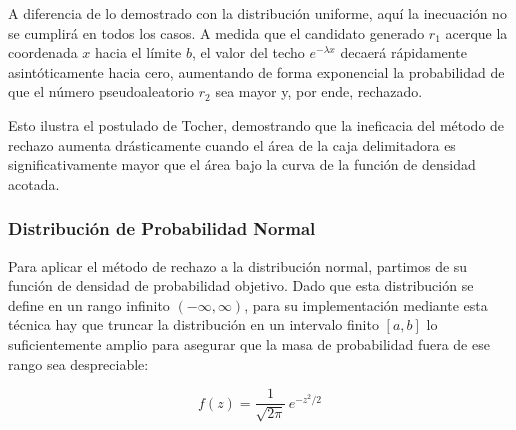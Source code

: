 \documentclass{article}
\begin{document}
A diferencia de lo demostrado con la distribución uniforme, aquí la inecuación no se
cumplirá en todos los casos. A medida que el candidato generado $r_1$ acerque la
coordenada $x$ hacia el límite $b$, el valor del techo $e^{-\lambda x}$ decaerá rápidamente
asintóticamente hacia cero, aumentando de forma exponencial la probabilidad de que el
número pseudoaleatorio $r_2$ sea mayor y, por ende, rechazado.

Esto ilustra el postulado de Tocher, demostrando que la ineficacia del método de rechazo
aumenta drásticamente cuando el área de la caja delimitadora es significativamente mayor
que el área bajo la curva de la función de densidad acotada.


\subsubsection{Distribución de Probabilidad Normal}

Para aplicar el método de rechazo a la distribución normal, partimos de su función de
densidad de probabilidad objetivo. Dado que esta distribución se define en un rango infinito
$(-\infty, \infty)$, para su implementación mediante esta técnica hay que truncar la
distribución en un intervalo finito $[a, b]$ lo suficientemente amplio para asegurar que la
masa de probabilidad fuera de ese rango sea despreciable:

\begin{equation}
    f(z) = \frac{1}{\sqrt{2\pi}}\, e^{-z^2/2}
\end{equation}
\end{document}
